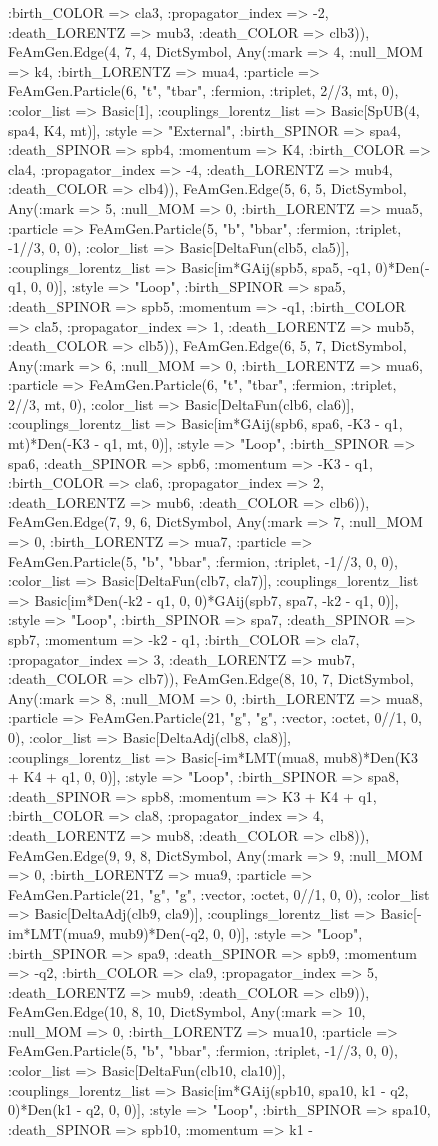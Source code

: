 \documentclass{revtex4}
\begin{document}
\begin{figure}[!htb]
\begin{center}
{:birth_COLOR => cla3, :propagator_index => -2, :death_LORENTZ => mub3, :death_COLOR => clb3)), FeAmGen.Edge(4, 7, 4, Dict{Symbol, Any}(:mark => 4, :null_MOM => k4, :birth_LORENTZ => mua4, :particle => FeAmGen.Particle(6, "t", "tbar", :fermion, :triplet, 2//3, mt, 0), :color_list => Basic[1], :couplings_lorentz_list => Basic[SpUB(4, spa4, K4, mt)], :style => "External", :birth_SPINOR => spa4, :death_SPINOR => spb4, :momentum => K4, :birth_COLOR => cla4, :propagator_index => -4, :death_LORENTZ => mub4, :death_COLOR => clb4)), FeAmGen.Edge(5, 6, 5, Dict{Symbol, Any}(:mark => 5, :null_MOM => 0, :birth_LORENTZ => mua5, :particle => FeAmGen.Particle(5, "b", "bbar", :fermion, :triplet, -1//3, 0, 0), :color_list => Basic[DeltaFun(clb5, cla5)], :couplings_lorentz_list => Basic[im*GAij(spb5, spa5, -q1, 0)*Den(-q1, 0, 0)], :style => "Loop", :birth_SPINOR => spa5, :death_SPINOR => spb5, :momentum => -q1, :birth_COLOR => cla5, :propagator_index => 1, :death_LORENTZ => mub5, :death_COLOR => clb5)), FeAmGen.Edge(6, 5, 7, Dict{Symbol, Any}(:mark => 6, :null_MOM => 0, :birth_LORENTZ => mua6, :particle => FeAmGen.Particle(6, "t", "tbar", :fermion, :triplet, 2//3, mt, 0), :color_list => Basic[DeltaFun(clb6, cla6)], :couplings_lorentz_list => Basic[im*GAij(spb6, spa6, -K3 - q1, mt)*Den(-K3 - q1, mt, 0)], :style => "Loop", :birth_SPINOR => spa6, :death_SPINOR => spb6, :momentum => -K3 - q1, :birth_COLOR => cla6, :propagator_index => 2, :death_LORENTZ => mub6, :death_COLOR => clb6)), FeAmGen.Edge(7, 9, 6, Dict{Symbol, Any}(:mark => 7, :null_MOM => 0, :birth_LORENTZ => mua7, :particle => FeAmGen.Particle(5, "b", "bbar", :fermion, :triplet, -1//3, 0, 0), :color_list => Basic[DeltaFun(clb7, cla7)], :couplings_lorentz_list => Basic[im*Den(-k2 - q1, 0, 0)*GAij(spb7, spa7, -k2 - q1, 0)], :style => "Loop", :birth_SPINOR => spa7, :death_SPINOR => spb7, :momentum => -k2 - q1, :birth_COLOR => cla7, :propagator_index => 3, :death_LORENTZ => mub7, :death_COLOR => clb7)), FeAmGen.Edge(8, 10, 7, Dict{Symbol, Any}(:mark => 8, :null_MOM => 0, :birth_LORENTZ => mua8, :particle => FeAmGen.Particle(21, "g", "g", :vector, :octet, 0//1, 0, 0), :color_list => Basic[DeltaAdj(clb8, cla8)], :couplings_lorentz_list => Basic[-im*LMT(mua8, mub8)*Den(K3 + K4 + q1, 0, 0)], :style => "Loop", :birth_SPINOR => spa8, :death_SPINOR => spb8, :momentum => K3 + K4 + q1, :birth_COLOR => cla8, :propagator_index => 4, :death_LORENTZ => mub8, :death_COLOR => clb8)), FeAmGen.Edge(9, 9, 8, Dict{Symbol, Any}(:mark => 9, :null_MOM => 0, :birth_LORENTZ => mua9, :particle => FeAmGen.Particle(21, "g", "g", :vector, :octet, 0//1, 0, 0), :color_list => Basic[DeltaAdj(clb9, cla9)], :couplings_lorentz_list => Basic[-im*LMT(mua9, mub9)*Den(-q2, 0, 0)], :style => "Loop", :birth_SPINOR => spa9, :death_SPINOR => spb9, :momentum => -q2, :birth_COLOR => cla9, :propagator_index => 5, :death_LORENTZ => mub9, :death_COLOR => clb9)), FeAmGen.Edge(10, 8, 10, Dict{Symbol, Any}(:mark => 10, :null_MOM => 0, :birth_LORENTZ => mua10, :particle => FeAmGen.Particle(5, "b", "bbar", :fermion, :triplet, -1//3, 0, 0), :color_list => Basic[DeltaFun(clb10, cla10)], :couplings_lorentz_list => Basic[im*GAij(spb10, spa10, k1 - q2, 0)*Den(k1 - q2, 0, 0)], :style => "Loop", :birth_SPINOR => spa10, :death_SPINOR => spb10, :momentum => k1 - }
\end{center}
\end{figure}
\end{document}
